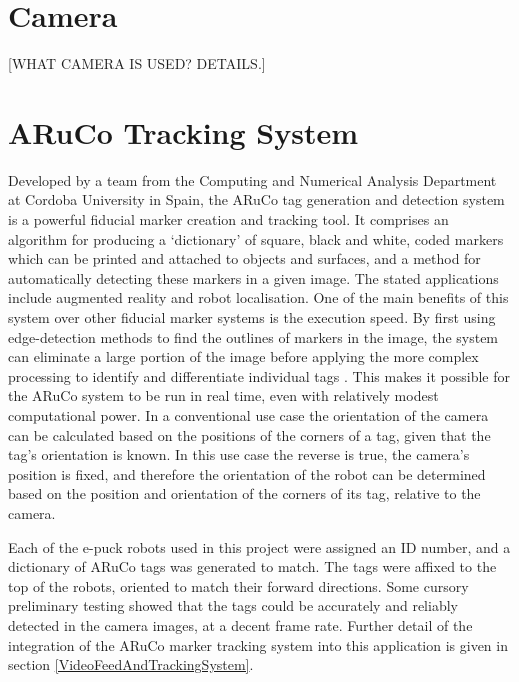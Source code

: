 
\section{Camera}
[WHAT CAMERA IS USED? DETAILS.]



\section{ARuCo Tracking System}
Developed by a team from the Computing and Numerical Analysis Department at Cordoba University in Spain, the ARuCo tag generation and detection system \cite{Garrido:2014} is a powerful fiducial marker creation and tracking tool. It comprises an algorithm for producing a `dictionary' of square, black and white, coded markers which can be printed and attached to objects and surfaces, and a method for automatically detecting these markers in a given image. The stated applications include augmented reality and robot localisation. One of the main benefits of this system over other fiducial marker systems is the execution speed. By first using edge-detection methods to find the outlines of markers in the image, the system can eliminate a large portion of the image before applying the more complex processing to identify and differentiate individual tags \cite{Garrido:2014}. This makes it possible for the ARuCo system to be run in real time, even with relatively modest computational power. In a conventional use case the orientation of the camera can be calculated based on the positions of the corners of a tag, given that the tag's orientation is known. In this use case the reverse is true, the camera's position is fixed, and therefore the orientation of the robot can be determined based on the position and orientation of the corners of its tag, relative to the camera. 

Each of the e-puck robots used in this project were assigned an ID number, and a dictionary of ARuCo tags was generated to match. The tags were affixed to the top of the robots, oriented to match their forward directions. Some cursory preliminary testing showed that the tags could be accurately and reliably detected in the camera images, at a decent frame rate. Further detail of the integration of the ARuCo marker tracking system into this application is given in section \ref{VideoFeedAndTrackingSystem}.

